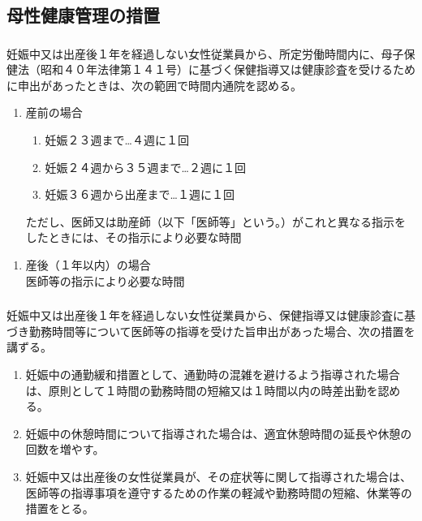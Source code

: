 \documentclass{jsarticle}
\begin{document}
\subsection{母性健康管理の措置}
\label{就規_条_母性健康管理の措置}
\subsubsection{}
\label{就規_項_母性健康管理のための受診等}
妊娠中又は出産後１年を経過しない女性従業員から、所定労働時間内に、母子保健法（昭和４０年法律第１４１号）に基づく保健指導又は健康診査を受けるために申出があったときは、次の範囲で時間内通院を認める。
  \begin{enumerate}
    \item 産前の場合
      \begin{enumerate}
        \item 妊娠２３週まで…４週に１回
        \item 妊娠２４週から３５週まで…２週に１回
        \item 妊娠３６週から出産まで…１週に１回
      \end{enumerate}
    ただし、医師又は助産師（以下「医師等」という。）がこれと異なる指示をしたときには、その指示により必要な時間
  \end{enumerate}
  \begin{enumerate}
    \item 産後（１年以内）の場合 \\
    医師等の指示により必要な時間
  \end{enumerate}
\subsubsection{}
\label{就規_項_医師等の指導に基づく母性健康管理の措置}
妊娠中又は出産後１年を経過しない女性従業員から、保健指導又は健康診査に基づき勤務時間等について医師等の指導を受けた旨申出があった場合、次の措置を講ずる。
  \begin{enumerate}
    \item 妊娠中の通勤緩和措置として、通勤時の混雑を避けるよう指導された場合は、原則として１時間の勤務時間の短縮又は１時間以内の時差出勤を認める。
    \item 妊娠中の休憩時間について指導された場合は、適宜休憩時間の延長や休憩の回数を増やす。
    \item 妊娠中又は出産後の女性従業員が、その症状等に関して指導された場合は、医師等の指導事項を遵守するための作業の軽減や勤務時間の短縮、休業等の措置をとる。
  \end{enumerate}
\end{document}
